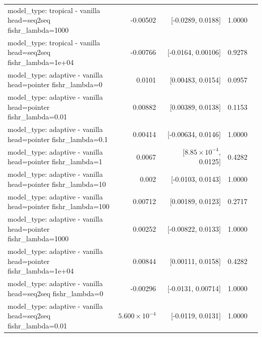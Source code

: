 \documentclass[10pt]{article}
\makeatletter
\newcommand{\stackcell}[1]{\begin{tabular}[t]{@{}l@{}}#1\end{tabular}}
\makeatother
\begin{document}
{\begin{longtable}{lrrrl}
\stackcell{model\_type: tropical - vanilla\\\footnotesize head=seq2seq fishr\_lambda=1000 } & -0.00502 & [-0.0289, 0.0188] & 1.0000 & \\
\stackcell{model\_type: tropical - vanilla\\\footnotesize head=seq2seq fishr\_lambda=1e+04 } & -0.00766 & [-0.0164, 0.00106] & 0.9278 & \\
\stackcell{model\_type: adaptive - vanilla\\\footnotesize head=pointer fishr\_lambda=0 } & 0.0101 & [0.00483, 0.0154] & 0.0957 & \\
\stackcell{model\_type: adaptive - vanilla\\\footnotesize head=pointer fishr\_lambda=0.01 } & 0.00882 & [0.00389, 0.0138] & 0.1153 & \\
\stackcell{model\_type: adaptive - vanilla\\\footnotesize head=pointer fishr\_lambda=0.1 } & 0.00414 & [-0.00634, 0.0146] & 1.0000 & \\
\stackcell{model\_type: adaptive - vanilla\\\footnotesize head=pointer fishr\_lambda=1 } & 0.0067 & [$8.85\times10^{-4}$, 0.0125] & 0.4282 & \\
\stackcell{model\_type: adaptive - vanilla\\\footnotesize head=pointer fishr\_lambda=10 } & 0.002 & [-0.0103, 0.0143] & 1.0000 & \\
\stackcell{model\_type: adaptive - vanilla\\\footnotesize head=pointer fishr\_lambda=100 } & 0.00712 & [0.00189, 0.0123] & 0.2717 & \\
\stackcell{model\_type: adaptive - vanilla\\\footnotesize head=pointer fishr\_lambda=1000 } & 0.00252 & [-0.00822, 0.0133] & 1.0000 & \\
\stackcell{model\_type: adaptive - vanilla\\\footnotesize head=pointer fishr\_lambda=1e+04 } & 0.00844 & [0.00111, 0.0158] & 0.4282 & \\
\stackcell{model\_type: adaptive - vanilla\\\footnotesize head=seq2seq fishr\_lambda=0 } & -0.00296 & [-0.0131, 0.00714] & 1.0000 & \\
\stackcell{model\_type: adaptive - vanilla\\\footnotesize head=seq2seq fishr\_lambda=0.01 } & $5.600\times10^{-4}$ & [-0.0119, 0.0131] & 1.0000 & \\

\end{longtable}}
\end{document}
